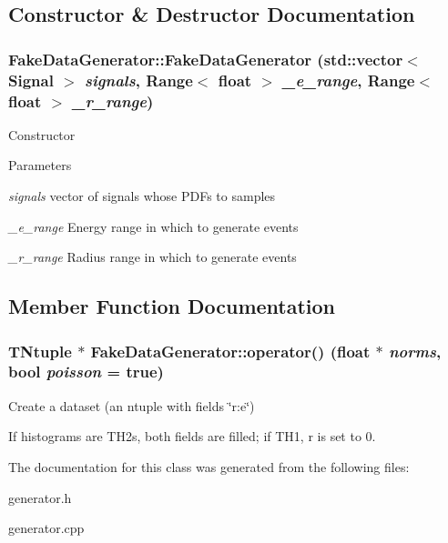 \subsection{Constructor \& Destructor Documentation}
\hypertarget{classFakeDataGenerator_a0ae60cc103b8b536fbccdfaddf393cbc}{
\subsubsection[{FakeDataGenerator}]{\setlength{\rightskip}{0pt plus 5cm}FakeDataGenerator::FakeDataGenerator (std::vector$<$ {\bf Signal} $>$ {\em signals}, \/  {\bf Range}$<$ float $>$ {\em \_\-e\_\-range}, \/  {\bf Range}$<$ float $>$ {\em \_\-r\_\-range})}}
\label{classFakeDataGenerator_a0ae60cc103b8b536fbccdfaddf393cbc}
Constructor


\begin{DoxyParams}{Parameters}
\item[{\em signals}]vector of signals whose PDFs to samples \item[{\em \_\-e\_\-range}]Energy range in which to generate events \item[{\em \_\-r\_\-range}]Radius range in which to generate events \end{DoxyParams}


\subsection{Member Function Documentation}
\hypertarget{classFakeDataGenerator_ab1084f63fb6a96cf9fc4d4cf12a39384}{
\subsubsection[{operator()}]{\setlength{\rightskip}{0pt plus 5cm}TNtuple $\ast$ FakeDataGenerator::operator() (float $\ast$ {\em norms}, \/  bool {\em poisson} = {\ttfamily true})}}
\label{classFakeDataGenerator_ab1084f63fb6a96cf9fc4d4cf12a39384}
Create a dataset (an ntuple with fields \char`\"{}r:e\char`\"{})

If histograms are TH2s, both fields are filled; if TH1, r is set to 0. 

The documentation for this class was generated from the following files:\begin{DoxyCompactItemize}
\item 
generator.h\item 
generator.cpp\end{DoxyCompactItemize}
